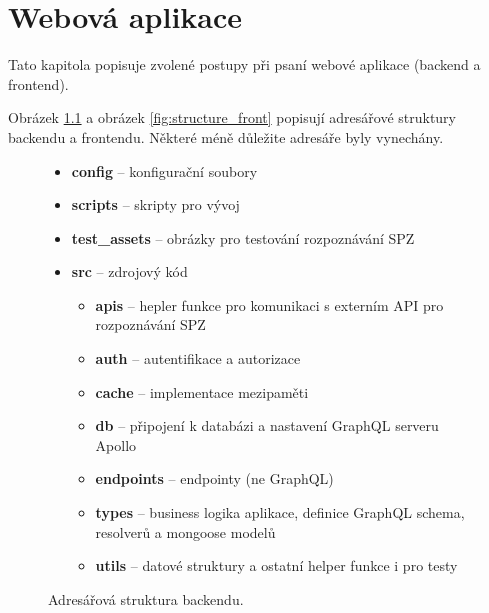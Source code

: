 
\chapter{Webová aplikace}

\noindent
Tato kapitola popisuje zvolené postupy při psaní webové aplikace (backend a frontend).

Obrázek \ref{fig:structure_back} a obrázek \ref{fig:structure_front} popisují adresářové
struktury backendu a frontendu.
Některé méně důležite adresáře byly vynechány.

\begin{figure} [!htb]
  \begin{itemize}
    \setlength\itemsep{.05em}
    \item \textbf{config} -- konfigurační soubory
    \item \textbf{scripts} -- skripty pro vývoj
    \item \textbf{test\_assets} -- obrázky pro testování rozpoznávání SPZ
    \item \textbf{src} -- zdrojový kód
    \begin{itemize}
      \setlength\itemsep{.05em}
      \item \textbf{apis} -- hepler funkce pro komunikaci s externím API pro rozpoznávání SPZ
      \item \textbf{auth} -- autentifikace a autorizace
      \item \textbf{cache} -- implementace mezipaměti
      \item \textbf{db} -- připojení k databázi a nastavení GraphQL serveru Apollo
      \item \textbf{endpoints} -- endpointy (ne GraphQL)
      \item \textbf{types} -- business logika aplikace, definice GraphQL schema, resolverů a mongoose modelů
      \item \textbf{utils} -- datové struktury a ostatní helper funkce i pro testy
    \end{itemize}
  \end{itemize}
  \caption{Adresářová struktura backendu.}
  \label{fig:structure_back}
  \end{figure}
  
